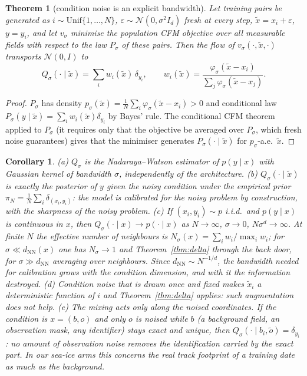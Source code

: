 \documentclass[11pt]{article}
\newtheorem{theorem}{Theorem}
\newtheorem{corollary}{Corollary}
\begin{document}
\begin{theorem}[condition noise is an explicit bandwidth]
\label{thm:noise}
Let training pairs be generated as $i\sim\mathrm{Unif}\{1,\dots,N\}$, $\varepsilon\sim\mathcal N(0,\sigma^2I_d)$ fresh at every step, $\tilde x=x_i+\varepsilon$, $y=y_i$, and let $v_\sigma$ minimise the population CFM objective over all measurable fields with respect to the law $P_\sigma$ of these pairs. Then the flow of $v_\sigma(\cdot,\tilde x,\cdot)$ transports $\mathcal N(0,I)$ to
\begin{equation}
Q_\sigma(\cdot\mid\tilde x)=\sum_i w_i(\tilde x)\,\delta_{y_i},\qquad w_i(\tilde x)=\frac{\varphi_\sigma(\tilde x-x_i)}{\sum_j\varphi_\sigma(\tilde x-x_j)} .
\end{equation}
\end{theorem}
\begin{proof}
$P_\sigma$ has density $p_\sigma(\tilde x)=\frac1N\sum_i\varphi_\sigma(\tilde x-x_i)>0$ and conditional law $P_\sigma(y\mid\tilde x)=\sum_iw_i(\tilde x)\delta_{y_i}$ by Bayes' rule. The conditional CFM theorem applied to $P_\sigma$ (it requires only that the objective be averaged over $P_\sigma$, which fresh noise guarantees) gives that the minimiser generates $P_\sigma(\cdot\mid\tilde x)$ for $p_\sigma$-a.e.\ $\tilde x$.
\end{proof}
\begin{corollary}
\label{cor:noise}
(a) $Q_\sigma$ is the Nadaraya--Watson estimator of $p(y\mid x)$ with Gaussian kernel of bandwidth $\sigma$, independently of the architecture.
(b) $Q_\sigma(\cdot\mid\tilde x)$ is exactly the posterior of $y$ given the noisy condition under the empirical prior $\pi_N=\frac1N\sum_i\delta_{(x_i,y_i)}$: the model is calibrated for the \emph{noisy} problem by construction, with the sharpness of the noisy problem.
(c) If $(x_i,y_i)\sim p$ i.i.d.\ and $p(y\mid x)$ is continuous in $x$, then $Q_\sigma(\cdot\mid x)\to p(\cdot\mid x)$ as $N\to\infty$, $\sigma\to0$, $N\sigma^d\to\infty$. At finite $N$ the effective number of neighbours is $N_\sigma(x)=\sum_iw_i/\max_iw_i$; for $\sigma\ll d_{\mathrm{NN}}(x)$ one has $N_\sigma\to1$ and Theorem~\ref{thm:delta} through the back door, for $\sigma\gg d_{\mathrm{NN}}$ averaging over neighbours. Since $d_{\mathrm{NN}}\sim N^{-1/d}$, the bandwidth needed for calibration grows with the condition dimension, and with it the information destroyed.
(d) Condition noise that is drawn once and \emph{fixed} makes $\tilde x_i$ a deterministic function of $i$ and Theorem~\ref{thm:delta} applies: such augmentation does not help.
(e) The mixing acts only along the noised coordinates. If the condition is $x=(b,o)$ and only $o$ is noised while $b$ (a background field, an observation \emph{mask}, any identifier) stays exact and unique, then $Q_\sigma(\cdot\mid b_i,\tilde o)=\delta_{y_i}$: no amount of observation noise removes the identification carried by the exact part. In our sea-ice arms this concerns the real track footprint of a training date as much as the background.
\end{corollary}
\end{document}
